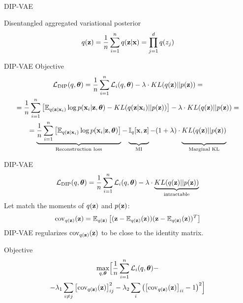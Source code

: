 \begin{frame}{DIP-VAE}
	\begin{block}{Disentangled aggregated variational posterior}
		\vspace{-0.3cm}
		\[
		q(\mathbf{z}) = \frac{1}{n} \sum_{i=1}^n q(\mathbf{z} | \mathbf{x}) = \prod_{j=1}^d q(z_j)
		\]
		\vspace{-0.3cm}
	\end{block}
	\begin{block}{DIP-VAE Objective}
		\vspace{-0.3cm}
		{\footnotesize
			\begin{multline*}
			\cL_{\text{DIP}}(q, \btheta) = \frac{1}{n} \sum_{i=1}^n \cL_i(q, \btheta) -\lambda \cdot KL(q(\bz) || p(\bz)) = \\
			= \frac{1}{n} \sum_{i=1}^n\left[ \bbE_{q(\bz | \bx_i)} \log p(\bx_i | \bz, \btheta) - KL(q(\bz | \bx_i) || p(\bz)) \right] -\lambda \cdot KL(q(\bz) || p(\bz)) = \\
			= \underbrace{ \frac{1}{n} \sum_{i=1}^n \left[\bbE_{q(\bz | \bx_i)} \log p(\bx_i | \bz, \btheta)\right]}_{\text{Reconstruction loss}} - \underbrace{\vphantom{\sum_{i=1}^n} \bbI_{q} [\bx, \bz]}_{\text{MI}} - (1 + \lambda) \cdot \underbrace{\vphantom{\sum_{i=1}^n} KL(q(\bz) || p(\bz))}_{\text{Marginal KL}}
			\end{multline*}
		}
		\vspace{-0.3cm}
	\end{block}

\end{frame}
\begin{frame}{DIP-VAE}
		\vspace{-0.2cm}
		\[
			\mathcal{L}_{\text{DIP}}(q, \boldsymbol{\theta}) = \frac{1}{n} \sum_{i=1}^n \mathcal{L}_i(q, \boldsymbol{\theta}) -\lambda \cdot \underbrace{KL(q(\mathbf{z}) || p(\mathbf{z}))}_{\text{intractable}}
		\]
	Let match the moments of $q(\mathbf{z})$ and $p(\mathbf{z})$:
	\[
	\text{cov}_{q(\mathbf{z})}(\mathbf{z}) = \mathbb{E}_{q(\mathbf{z})} \left[ (\mathbf{z} - \mathbb{E}_{q(\mathbf{z})}(\mathbf{z})) (\mathbf{z} - \mathbb{E}_{q(\mathbf{z})}(\mathbf{z}))^T \right]
	\]
	DIP-VAE regularizes $\text{cov}_{q(\mathbf{z})}(\mathbf{z}) $ to be close to the identity matrix. 
	\begin{block}{Objective}
		\vspace{-0.5cm}
		\begin{multline*}
		\max_{q, \boldsymbol{\theta}} \Bigl[\frac{1}{n} \sum_{i=1}^n \mathcal{L}_i(q, \boldsymbol{\theta}) - \\ - \lambda_1 \sum_{i \neq j} \left[\text{cov}_{q(\mathbf{z})} (\mathbf{z}) \right]^2_{ij} - \lambda_2 \sum_{i} \left( \left[ \text{cov}_{q(\mathbf{z})} (\mathbf{z}) \right]_{ii} - 1 \right)^2 \Bigr]
		\end{multline*}
		\vspace{-0.5cm}
	\end{block}

\end{frame}

